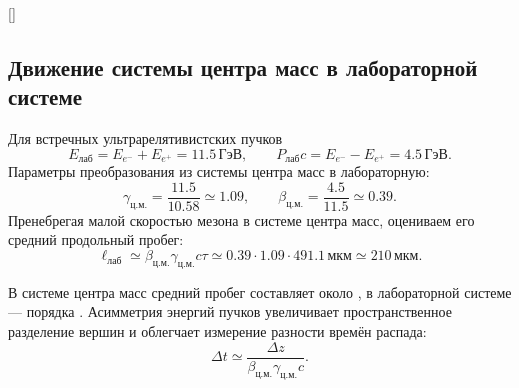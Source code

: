 \documentclass[../final.tex]{subfiles}
\begin{document}
\begin{rbox}[left=16pt,right=16pt,top=12pt,bottom=10pt]{[]}
    \centering
    \captionsetup{font=footnotesize,labelfont=bf,skip=5pt}
    \label{fig:b_vertices_sem5}
\end{rbox}

\subsection*{Движение системы центра масс в лабораторной системе}

Для встречных ультрарелятивистских пучков
\begin{equation*}
    E_{\text{лаб}}=E_{e^-}+E_{e^+}=11.5\,\text{ГэВ},
    \qquad
    P_{\text{лаб}}c=E_{e^-}-E_{e^+}=4.5\,\text{ГэВ}.
\end{equation*}
Параметры преобразования из системы центра масс в лабораторную:
\begin{equation*}
    \gamma_{\text{ц.м.}}=\frac{11.5}{10.58}\simeq1.09,
    \qquad
    \beta_{\text{ц.м.}}=\frac{4.5}{11.5}\simeq0.39.
\end{equation*}
Пренебрегая малой скоростью мезона в системе центра масс,
оцениваем его средний продольный пробег:
\begin{equation*}
    \ell_{\text{лаб}}\simeq
    \beta_{\text{ц.м.}}\gamma_{\text{ц.м.}}c\tau
    \simeq0.39\cdot1.09\cdot491.1\,\text{мкм}
    \simeq210\,\text{мкм}.
\end{equation*}

\answer
В системе центра масс средний пробег составляет около
, в лабораторной системе --- порядка
. Асимметрия энергий пучков увеличивает
пространственное разделение вершин и облегчает измерение разности времён
распада:
\begin{equation*}
    \Delta t\simeq\frac{\Delta z}
    {\beta_{\text{ц.м.}}\gamma_{\text{ц.м.}}c}.
\end{equation*}
\end{document}
